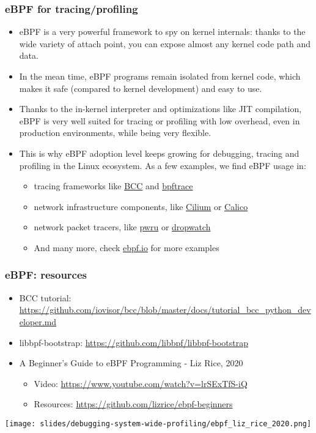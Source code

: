\begin{frame}[fragile]
\frametitle{eBPF for tracing/profiling}
  \begin{itemize}
    \item eBPF is a very powerful framework to spy on kernel internals: thanks
    to the wide variety of attach point, you can expose almost any kernel code path and data.
    \item In the mean time, eBPF programs remain isolated from kernel code,
    which makes it safe (compared to kernel development) and easy to use.
    \item Thanks to the in-kernel interpreter and optimizations like JIT compilation, eBPF is very well
    suited for tracing or profiling with low overhead, even in production
    environments, while being very flexible.
    \item This is why eBPF adoption level keeps growing for debugging, tracing
    and profiling in the Linux ecosystem. As a few examples, we find eBPF usage in:
    \begin{itemize}
      \item tracing frameworks like \href{https://github.com/iovisor/bcc}{BCC}
      and \href{https://github.com/bpftrace/bpftrace}{bpftrace}
      \item network infrastructure components, like
      \href{https://github.com/cilium/cilium}{Cilium} or \href{https://github.com/projectcalico/calico}{Calico}
      \item network packet tracers, like
      \href{https://github.com/cilium/pwru}{pwru} or
      \href{https://github.com/feiskyer/dropwatch}{dropwatch}
      \item And many more, check \href{https://ebpf.io/applications/}{ebpf.io}
      for more examples
    \end{itemize}
  \end{itemize}
\end{frame}

\begin{frame}[fragile]
  \frametitle{eBPF: resources}
  \begin{itemize}
     \item BCC tutorial:
     \url{https://github.com/iovisor/bcc/blob/master/docs/tutorial_bcc_python_developer.md}
     \item libbpf-bootstrap: \url{https://github.com/libbpf/libbpf-bootstrap}
    \item A Beginner’s Guide to eBPF Programming - Liz Rice, 2020
    \begin{itemize}
      \item Video: \url{https://www.youtube.com/watch?v=lrSExTfS-iQ}
      \item Resources: \url{https://github.com/lizrice/ebpf-beginners}
    \end{itemize}
  \end{itemize}
  \begin{center}
     \texttt{[image: slides/debugging-system-wide-profiling/ebpf\_liz\_rice\_2020.png]}
  \end{center}
\end{frame}

